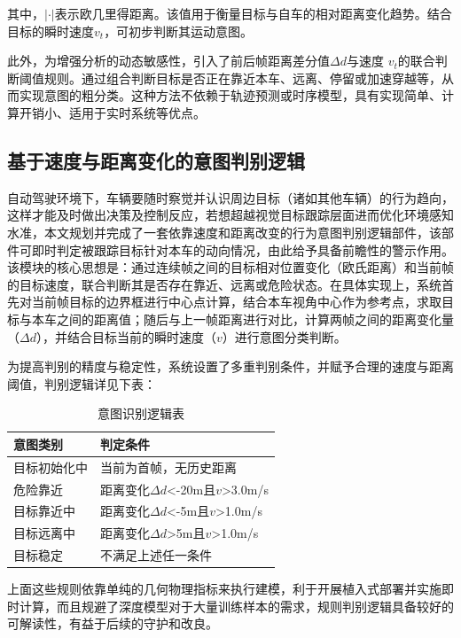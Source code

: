 其中，$\left| \cdot \right|$表示欧几里得距离。该值用于衡量目标与自车的相对距离变化趋势。结合目标的瞬时速度$v_t$，可初步判断其运动意图。

此外，为增强分析的动态敏感性，引入了前后帧距离差分值$\Delta d$与速度 $v_t$的联合判断阈值规则。通过组合判断目标是否正在靠近本车、远离、停留或加速穿越等，从而实现意图的粗分类。这种方法不依赖于轨迹预测或时序模型，具有实现简单、计算开销小、适用于实时系统等优点。

\subsection{基于速度与距离变化的意图判别逻辑}

自动驾驶环境下，车辆要随时察觉并认识周边目标（诸如其他车辆）的行为趋向，这样才能及时做出决策及控制反应，若想超越视觉目标跟踪层面进而优化环境感知水准，本文规划并完成了一套依靠速度和距离改变的行为意图判别逻辑部件，该部件可即时判定被跟踪目标针对本车的动向情况，由此给予具备前瞻性的警示作用。
该模块的核心思想是：通过连续帧之间的目标相对位置变化（欧氏距离）和当前帧的目标速度，联合判断其是否存在靠近、远离或危险状态。在具体实现上，系统首先对当前帧目标的边界框进行中心点计算，结合本车视角中心作为参考点，求取目标与本车之间的距离值；随后与上一帧距离进行对比，计算两帧之间的距离变化量（$\Delta d$），并结合目标当前的瞬时速度（$v$）进行意图分类判断。

为提高判别的精度与稳定性，系统设置了多重判别条件，并赋予合理的速度与距离阈值，判别逻辑详见下表：

\begin{table}[htbp]
	\caption{意图识别逻辑表}
	\label{tab:timetable}
	\centering
	\begin{tabular}{ll}
		\toprule
		意图类别 & 判定条件 \\
		\midrule
		目标初始化中 & 当前为首帧，无历史距离 \\
		危险靠近 & 距离变化$\Delta d$<-20m且$v$>3.0m/s \\
		目标靠近中 & 距离变化$\Delta d$<-5m且$v$>1.0m/s \\
		目标远离中 & 距离变化$\Delta d$>5m且$v$>1.0m/s \\
		目标稳定 & 不满足上述任一条件 \\
		\bottomrule
	\end{tabular}
\end{table}

上面这些规则依靠单纯的几何物理指标来执行建模，利于开展植入式部署并实施即时计算，而且规避了深度模型对于大量训练样本的需求，规则判别逻辑具备较好的可解读性，有益于后续的守护和改良。

